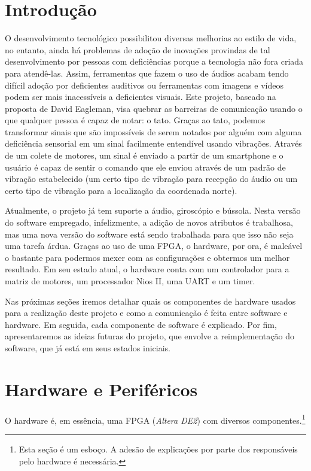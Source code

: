 \documentclass{sig-alternate-05-2015}
\begin{document}
\section{Introdução}
    O desenvolvimento tecnológico possibilitou diversas melhorias ao estilo de
    vida, no entanto, ainda há problemas de adoção de inovações provindas de
    tal desenvolvimento por pessoas com deficiências porque a tecnologia não
    fora criada para atendê-las. Assim, ferramentas que fazem o uso de áudios
    acabam tendo difícil adoção por deficientes auditivos ou ferramentas com
    imagens e vídeos podem ser mais inacessíveis a deficientes visuais. Este
    projeto, baseado na proposta de David
    Eagleman\cite{eaglemanNewSensesHumans}, visa quebrar as barreiras de
    comunicação usando o que qualquer pessoa é capaz de notar: o tato. Graças
    ao tato, podemos transformar sinais que são impossíveis de serem notados
    por alguém com alguma deficiência sensorial em um sinal facilmente
    entendível usando vibrações. Através de um colete de motores, um sinal é
    enviado a partir de um smartphone e o usuário é capaz de sentir o comando
    que ele enviou através de um padrão de vibração estabelecido (um certo tipo
    de vibração para recepção do áudio ou um certo tipo de vibração para a
    localização da coordenada norte).

    Atualmente, o projeto já tem suporte a áudio, giroscópio e bússola. Nesta
    versão do software empregado, infelizmente, a adição de novos atributos é
    trabalhosa, mas uma nova versão do software está sendo trabalhada para que
    isso não seja uma tarefa árdua. Graças ao uso de uma FPGA, o hardware, por
    ora, é maleável o bastante para podermos mexer com as configurações e
    obtermos um melhor resultado. Em seu estado atual, o hardware conta com um
    controlador para a matriz de motores, um processador Nios II, uma UART e um
    timer.
    
    Nas próximas seções iremos detalhar quais os componentes de hardware usados
    para a realização deste projeto e como a comunicação é feita entre software
    e hardware. Em seguida, cada componente de software é explicado. Por fim,
    apresentaremos as ideias futuras do projeto, que envolve a reimplementação
    do software, que já está em seus estados iniciais.

\section{Hardware e Periféricos}
    O hardware é, em essência, uma FPGA (\textit{Altera DE2}) com diversos
    componentes.\footnote{Esta seção é um esboço. A adesão de explicações por
    parte dos responsáveis pelo hardware é necessária.}
\end{document}
